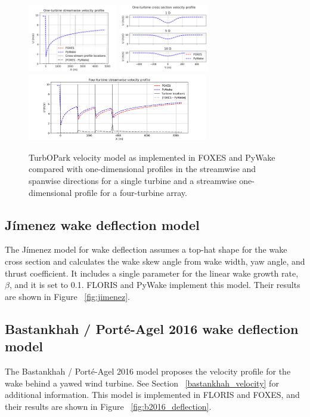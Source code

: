\documentclass{iopconfser}
\begin{document}
\begin{figure}[]
\centering
\includegraphics[width=0.35\textwidth]{figures/turbopark 1t x.png}
\includegraphics[width=0.35\textwidth]{figures/turbopark 1t y.png}
\\
\includegraphics[width=0.7\textwidth]{figures/turbopark 4t.png}
\caption{TurbOPark velocity model as implemented in FOXES and PyWake compared with one-dimensional profiles in the streamwise and spanwise directions for a single turbine and a streamwise one-dimensional profile for a four-turbine array.}
\label{fig:turbopark}
\end{figure}

\subsection{Jímenez wake deflection model}
The Jímenez model for wake deflection assumes a top-hat shape for the wake cross section and calculates the wake skew angle from wake width, yaw angle, and thrust coefficient.
It includes a single parameter for the linear wake growth rate, $\beta$, and it is set to 0.1.
FLORIS and PyWake implement this model. Their results are shown in Figure ~\ref{fig:jimenez}.

\subsection{Bastankhah / Porté-Agel 2016  wake deflection model} \label{bastankhah_deflection}
The Bastankhah / Porté-Agel 2016 model proposes the velocity profile for the wake behind a yawed wind turbine.
See Section ~\ref{bastankhah_velocity} for additional information. This model is implemented in FLORIS and FOXES, and their results are shown in Figure ~\ref{fig:b2016_deflection}.
\end{document}
